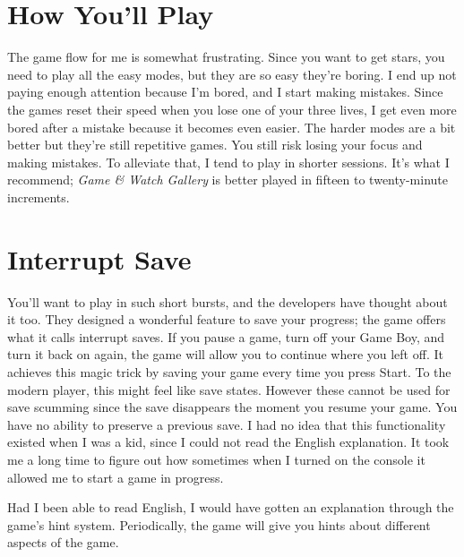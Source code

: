 \documentclass{book}
\let\oldcenter\center
\let\oldendcenter\endcenter
\renewenvironment{center}{\setlength\topsep{0pt}\oldcenter}{\oldendcenter}
\begin{document}
\FloatBarrier\needspace{5pt}\section*{How You’ll Play}\nopagebreak[4]

The game flow for me is somewhat frustrating. Since you want to get stars, you need to play all the easy modes, but they are so easy they’re boring. I end up not paying enough attention because I’m bored, and I start making mistakes. Since the games reset their speed when you lose one of your three lives, I get even more bored after a mistake because it becomes even easier. The harder modes are a bit better but they’re still repetitive games. You still risk losing your focus and making mistakes. To alleviate that, I tend to play in shorter sessions. It’s what I recommend; \emph{Game \& Watch Gallery} is better played in fifteen to twenty-minute increments.

\FloatBarrier\needspace{5pt}\section*{Interrupt Save}\nopagebreak[4]

\begin{center}
\vspace{8pt}
\quad\vspace{4pt}
\end{center}

You’ll want to play in such short bursts, and the developers have thought about it too. They designed a wonderful feature to save your progress; the game offers what it calls interrupt saves. If you pause a game, turn off your Game Boy, and turn it back on again, the game will allow you to continue where you left off. It achieves this magic trick by saving your game every time you press Start. To the modern player, this might feel like save states. However these cannot be used for save scumming since the save disappears the moment you resume your game. You have no ability to preserve a previous save. I had no idea that this functionality existed when I was a kid, since I could not read the English explanation. It took me a long time to figure out how sometimes when I turned on the console it allowed me to start a game in progress.

Had I been able to read English, I would have gotten an explanation through the game’s hint system. Periodically, the game will give you hints about different aspects of the game.
\end{document}
